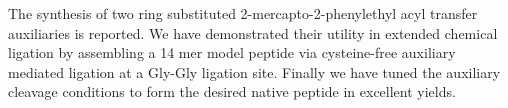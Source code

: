 


\begin{abstracts}        %

The synthesis of two ring substituted 2-mercapto-2-phenylethyl acyl transfer auxiliaries is reported. We have demonstrated their utility in extended chemical ligation by assembling a 14 mer model peptide via cysteine-free auxiliary mediated ligation at a Gly-Gly ligation site. Finally we have tuned the auxiliary cleavage conditions to form the desired native peptide in excellent yields.

\end{abstracts}




